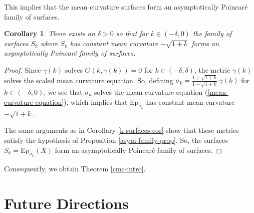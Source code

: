 \documentclass{amsart}
\newtheorem{cor}[thm]{Corollary}
\begin{document}
This implies that the mean curvature surfaces form an asymptotically Poincar\'e family of surfaces. 

\begin{cor}
There exists an $\delta > 0$ so that for $k \in (-\delta, 0)$ the family of surfaces $S_k$ where $S_k$ has constant mean curvature $-\sqrt{1+k}$ forms an asymptotically Poincar\'e family of surfaces. 
\end{cor}

\begin{proof}
Since $\gamma(k)$ solves $G(k,\gamma(k)) = 0$ for $k \in (-\delta,\delta)$, the metric $\gamma(k)$ solves the scaled mean curvature equation. 
So, defining $\sigma_k = \frac{1 + \sqrt{1+k}}{1 - \sqrt{1+k}} \ \gamma(k)$ for $k \in (-\delta,0)$, we see that $\sigma_k$ solves the mean curvature equation (\ref{mean-curvature-equation}), which implies that $\mathrm{Ep}_{\sigma_k}$ has constant mean curvature $-\sqrt{1+k}$.

The same arguments as in Corollary \ref{k-surfaces-cor} show that these metrics satisfy the hypothesis of Proposition \ref{asym-family-prop}.
So, the surfaces $S_k = \mathrm{Ep}_{\sigma_{k}}(X)$ form an asymptotically Poincar\'e family of surfaces. 
\end{proof}

Consequently, we obtain Theorem \ref{cmc-intro}.


\section{Future Directions}
\end{document}
